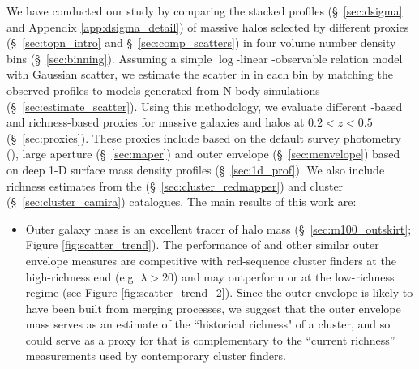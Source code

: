 \documentclass[fleqn,usenatbib,useAMS]{mnras}
\begin{document}
\begin{CJK*}{UTF8}{gbsn}
    We have conducted our study by comparing the stacked \dsigma{} profiles (\S\ \ref{sec:dsigma}
    and Appendix \ref{app:dsigma_detail}) of massive halos selected by different \mvir{} proxies
    (\S\ \ref{sec:topn_intro} and \S\ \ref{sec:comp_scatters}) in four volume number density bins
    (\S\ \ref{sec:binning}).
    Assuming a simple $\log$-linear \mvir{}-observable relation model with Gaussian scatter, we
    estimate the scatter in \mvir{} in each bin by matching the observed \dsigma{} profiles to
    models generated from N-body simulations (\S\ \ref{sec:estimate_scatter}).
    Using this \topn{} methodology, we evaluate different \mstar{}-based and richness-based \mvir{}
    proxies for massive galaxies and halos at $0.2 < z < 0.5$ (\S\ \ref{sec:proxies}).
    These proxies include \mstar{} based on the default survey photometry (\cmodel{}), large
    aperture \mstar{} (\S\ \ref{sec:maper}) and outer envelope \mstar{} (\S\ \ref{sec:menvelope})
    based on deep 1-D surface mass density profiles (\S\ \ref{sec:1d_prof}).
    We also include richness estimates from the \redm{} (\S\ \ref{sec:cluster_redmapper}) and
    \camira{} cluster (\S\ \ref{sec:cluster_camira}) catalogues.
    The main results of this work are:
    
    \begin{itemize}
    
        \item Outer galaxy mass is an excellent tracer of halo mass (\S\ \ref{sec:m100_outskirt};
            Figure \ref{fig:scatter_trend}). 
            The performance of  and other similar outer envelope measures are 
            competitive with red-sequence cluster finders at the high-richness end (e.g. $\lambda >
            20$) and may outperform \redm{} or \camira{} at the low-richness regime 
            (see Figure \ref{fig:scatter_trend_2}).
            Since the outer envelope is likely to have been built from merging processes, we suggest
            that the outer envelope mass serves as an estimate of the ``historical richness" of a
            cluster, and so could serve as a proxy for \mvir{} that is complementary to the 
            ``current richness'' measurements used by contemporary cluster finders.
        

\end{itemize}
\end{CJK*}
\end{document}
